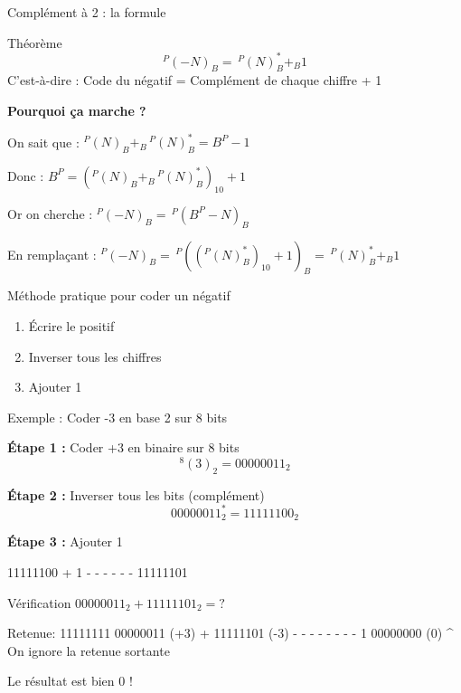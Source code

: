 \documentclass[aspectratio=1610]{beamer}
\begin{document}
\begin{frame}{Complément à 2 : la formule}

  \begin{block}{Théorème}
    \[
      ^P(-N)_B = \, ^P(N)_B^* +_B 1
    \]
    C'est-à-dire : Code du négatif = Complément de chaque chiffre + 1
  \end{block}

  \vspace{0.5em}

  \textbf{Pourquoi ça marche ?}

  On sait que : $^P(N)_B +_B \, ^P(N)_B^* = B^P - 1$

  Donc : $B^P = (^P(N)_B +_B \, ^P(N)_B^*)_{10} + 1$

  Or on cherche : $^P(-N)_B = \, ^P(B^P - N)_B$

  En remplaçant : $^P(-N)_B = \, ^P((^P(N)_B^*)_{10} + 1)_B = \, ^P(N)_B^* +_B 1$ 


  \begin{exampleblock}{Méthode pratique pour coder un négatif}
    \begin{enumerate}
      \item Écrire le positif
      \item Inverser tous les chiffres
      \item Ajouter 1
    \end{enumerate}
  \end{exampleblock}

\end{frame}

\begin{frame}{Exemple : Coder -3 en base 2 sur 8 bits}

  \textbf{Étape 1 :} Coder +3 en binaire sur 8 bits
  \[
    ^8(3)_2 = 00000011_2
  \]

  \textbf{Étape 2 :} Inverser tous les bits (complément)
  \[
    00000011_2^* = 11111100_2
  \]

  \textbf{Étape 3 :} Ajouter 1
  \begin{semiverbatim}
      11111100
    +        1
    - - - - - - 
      11111101
  \end{semiverbatim}


  \begin{exampleblock}{Vérification}
    $00000011_2 + 11111101_2 = ?$
    \begin{semiverbatim}
  Retenue: 11111111 
            00000011  (+3)
          + 11111101  (-3)
          - - - - - - - - 
          1 00000000  (0) 
            ^
      On ignore la retenue sortante
    \end{semiverbatim}
    Le résultat est bien 0 !
  \end{exampleblock}

\end{frame}
\end{document}

